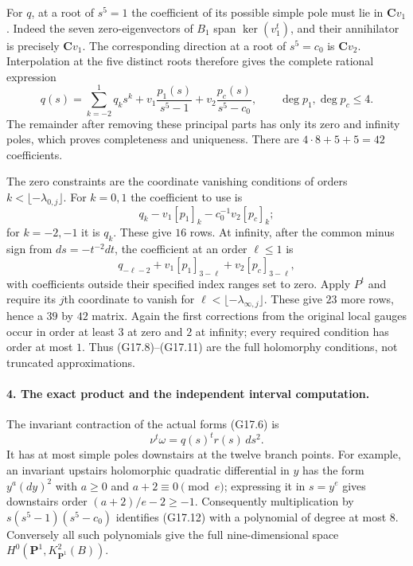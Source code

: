 For $q$, at a root of $s^5=1$ the coefficient of its possible
simple pole must lie in $\mathbf Cv_1$.  Indeed the seven
zero-eigenvectors of $B_1$ span $\ker(v_1^t)$, and their annihilator
is precisely $\mathbf Cv_1$.  The corresponding direction at a
root of $s^5=c_0$ is $\mathbf Cv_2$.
Interpolation at the five distinct roots therefore gives the
complete rational expression
\begin{equation}
 q(s)=\sum_{k=-2}^{1}q_ks^k+
       v_1\frac{p_1(s)}{s^5-1}
          +v_2\frac{p_c(s)}{s^5-c_0},
 \qquad \deg p_1,\deg p_c\le4.                       \tag{G17.10}
\end{equation}
The remainder after removing these principal parts has only its
zero and infinity poles, which proves completeness and uniqueness.
There are $4\cdot8+5+5=42$ coefficients.

The zero constraints are the coordinate vanishing conditions of
orders $k<\lfloor-\lambda_{0,j}\rfloor$.
For $k=0,1$ the coefficient to use is
\[
        q_k-v_1[p_1]_k-c_0^{-1}v_2[p_c]_k;
\]
for $k=-2,-1$ it is $q_k$.  These give $16$ rows.
At infinity, after the common minus sign from $ds=-t^{-2}dt$,
the coefficient at an order $\ell\le1$ is
\[
 q_{-\ell-2}
        +v_1[p_1]_{3-\ell}+v_2[p_c]_{3-\ell},          \tag{G17.11}
\]
with coefficients outside their specified index ranges set to zero.
Apply $P^t$ and require its $j$th coordinate to vanish for
$\ell<\lfloor-\lambda_{\infty,j}\rfloor$.
These give $23$ more rows, hence a $39$ by $42$ matrix.
Again the first corrections from the original local gauges occur
in order at least $3$ at zero and $2$ at infinity; every required
condition has order at most $1$.  Thus (G17.8)--(G17.11) are the
full holomorphy conditions, not truncated approximations.

\paragraph{4. The exact product and the independent interval computation.}
The invariant contraction of the actual forms (G17.6) is
\begin{equation}
                    \nu^t\omega=q(s)^tr(s)\,ds^2.     \tag{G17.12}
\end{equation}
It has at most simple poles downstairs at the twelve branch points.
For example, an invariant upstairs holomorphic quadratic differential
in $y$ has the form $y^a(dy)^2$ with $a\ge0$ and
$a+2\equiv0\pmod e$; expressing it in $s=y^e$ gives downstairs
order $(a+2)/e-2\ge-1$.
Consequently multiplication by
$s(s^5-1)(s^5-c_0)$ identifies (G17.12) with a polynomial of degree
at most $8$.  Conversely all such polynomials give the full
nine-dimensional space
$H^0(\mathbf P^1,K_{\mathbf P^1}^2(B))$.

